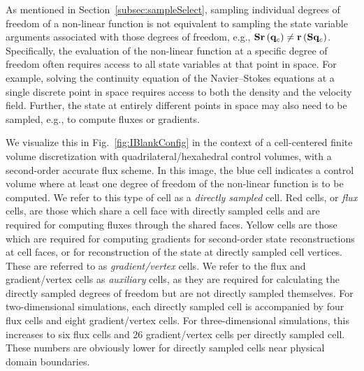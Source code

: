 As mentioned in Section~\ref{subsec:sampleSelect}, sampling individual degrees of freedom of a non-linear function is not equivalent to sampling the state variable arguments associated with those degrees of freedom, e.g., $\mathbf{S} \mathbf{r}\left(\mathbf{q}_{c}\right) \neq \mathbf{r}\left(\mathbf{S} \mathbf{q}_{c}\right)$. Specifically, the evaluation of the non-linear function at a specific degree of freedom often requires access to all state variables at that point in space. For example, solving the continuity equation of the Navier--Stokes equations at a single discrete point in space requires access to both the density and the velocity field. Further, the state at entirely different points in space may also need to be sampled, e.g., to compute fluxes or gradients.

We visualize this in Fig.~\ref{fig:IBlankConfig} in the context of a cell-centered finite volume discretization with quadrilateral/hexahedral control volumes, with a second-order accurate flux scheme. In this image, the blue cell indicates a control volume where at least one degree of freedom of the non-linear function is to be computed. We refer to this type of cell as a \textit{directly sampled} cell. Red cells, or \textit{flux} cells, are those which share a cell face with directly sampled cells and are required for computing fluxes through the shared faces. Yellow cells are those which are required for computing gradients for second-order state reconstructions at cell faces, or for reconstruction of the state at directly sampled cell vertices. These are referred to as \textit{gradient/vertex} cells. We refer to the flux and gradient/vertex cells as \textit{auxiliary} cells, as they are required for calculating the directly sampled degrees of freedom but are not directly sampled themselves. For two-dimensional simulations, each directly sampled cell is accompanied by four flux cells and eight gradient/vertex cells. For three-dimensional simulations, this increases to six flux cells and 26 gradient/vertex cells per directly sampled cell. These numbers are obviously lower for directly sampled cells near physical domain boundaries.

